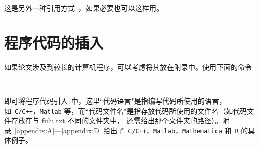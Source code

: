 这是另外一种引用方式~\cite{das}，如果必要也可以这样用。


\section{程序代码的插入}\label{sec:codeinludsion}如果论文涉及到较长的计算机程序，可以考虑将其放在附录中。使用下面的命令
\begin{verbatim}
        
\end{verbatim}
即可将程序代码引入~\CTeX 中，这里``代码语言"是指编写代码所使用的语言，如~{\tt C/C++}，{\tt Matlab} 等，而``代码文件名"是指存放代码所使用的文件名（如代码文件存放在与 fulu.txt 不同的文件夹中，
还需给出那个文件夹的路径）。附录~\ref{appendix:A}---\ref{appendix:D}
给出了~{\tt C/C++}，{\tt Matlab}，{\tt Mathematica} 和~{\tt R} 的具体例子。

